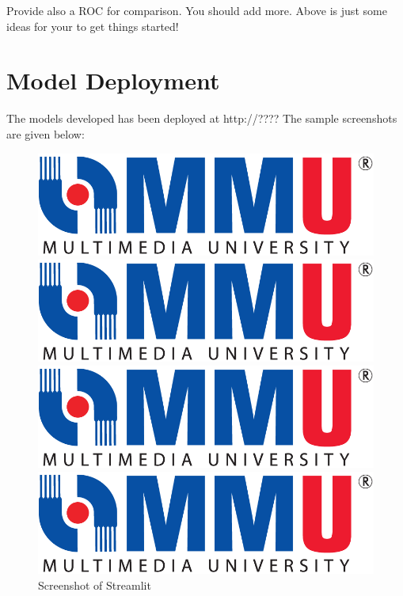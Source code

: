 \documentclass[12pt,a4paper,oneside]{article}
\begin{document}
Provide also a ROC for comparison.
You should add more. Above is just some ideas for your to get things started!

\section{Model Deployment}

The models developed has been deployed at http://????
The sample screenshots are given below:

\begin{figure}[h]
\begin{multicols}{2}
    \includegraphics[width=\linewidth]{mmu.png}\par 
    \includegraphics[width=\linewidth]{mmu.png}\par 
    \end{multicols}
\begin{multicols}{2}
    \includegraphics[width=\linewidth]{mmu.png}\par
    \includegraphics[width=\linewidth]{mmu.png}\par
\end{multicols}
\caption{Screenshot of Streamlit}
\end{figure}
\end{document}
